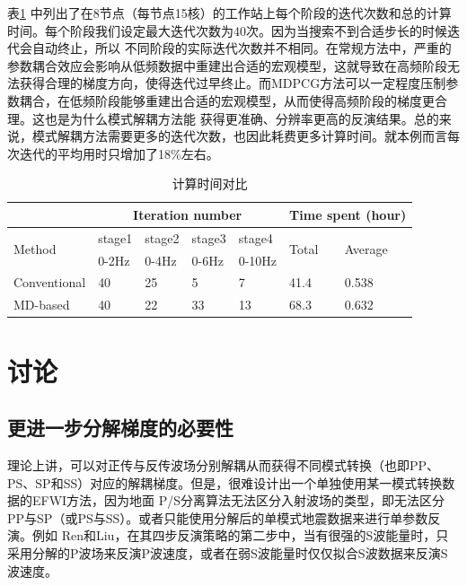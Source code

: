 表\ref{table:TotalComputime}
中列出了在8节点（每节点15核）的工作站上每个阶段的迭代次数和总的计算时间。每个阶段我们设定最大迭代次数为40次。因为当搜索不到合适步长的时候迭代会自动终止，所以
不同阶段的实际迭代次数并不相同。在常规方法中，严重的参数耦合效应会影响从低频数据中重建出合适的宏观模型，这就导致在高频阶段无法获得合理的梯度方向，使得迭代过早终止。而MDPCG方法可以一定程度压制参数耦合，在低频阶段能够重建出合适的宏观模型，从而使得高频阶段的梯度更合理。这也是为什么模式解耦方法能
获得更准确、分辨率更高的反演结果。总的来说，模式解耦方法需要更多的迭代次数，也因此耗费更多计算时间。就本例而言每次迭代的平均用时只增加了18\%左右。
\begin{table}[!htb]
    \caption{计算时间对比}
    \label{table:TotalComputime}
	\centering 
    \begin{tabular}{p{1.8cm}p{1.0cm}p{1.0cm}p{1.0cm}p{1.2cm}p{1.0cm}p{1.0cm}}
    \hline
    \quad&\multicolumn{4}{c}{Iteration number}&\multicolumn{2}{c}{Time spent (hour)} \\
    \hline
    \multirow{2}{*}{Method} & stage1 &stage2 &stage3 &stage4 &\multirow{2}{*}{Total}
    &\multirow{2}{*}{Average} \\
    & 0-2Hz &0-4Hz&0-6Hz&0-10Hz\\
    \hline
    Conventional&  40   &25&5& 7  &41.4&0.538\\
    MD-based &   40  & 22 &33 &13&68.3&0.632\\
    \hline
    \end{tabular}
\end{table}
\section{讨论}
\subsection{更进一步分解梯度的必要性}
理论上讲，可以对正传与反传波场分别解耦从而获得不同模式转换（也即PP、PS、SP和SS）对应的解耦梯度。但是，很难设计出一个单独使用某一模式转换数据的EFWI方法，因为地面
P/S分离算法无法区分入射波场的类型，即无法区分PP与SP（或PS与SS）。或者只能使用分解后的单模式地震数据来进行单参数反演。例如
Ren和Liu\cite{ren.liu:2016}，在其四步反演策略的第二步中，当有很强的S波能量时，只采用分解的P波场来反演P波速度，或者在弱S波能量时仅仅拟合S波数据来反演S波速度。


